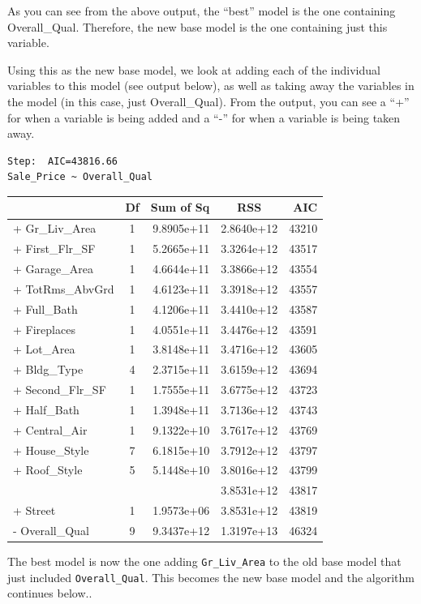 \documentclass[
  letterpaper,
  DIV=11,
  numbers=noendperiod]{scrreprt}
\begin{document}
As you can see from the above output, the ``best'' model is the one
containing Overall\_Qual. Therefore, the new base model is the one
containing just this variable. ~

Using this as the new base model, we look at adding each of the
individual variables to this model (see output below), as well as taking
away the variables in the model (in this case, just Overall\_Qual). From
the output, you can see a ``+'' for when a variable is being added and a
``-'' for when a variable is being taken away.

\begin{verbatim}
Step:  AIC=43816.66
Sale_Price ~ Overall_Qual
\end{verbatim}

\begin{longtable}[]{@{}lcrcr@{}}
\toprule()
& Df & Sum of Sq & RSS & AIC \\
\midrule()
\endhead
+ Gr\_Liv\_Area & 1 & 9.8905e+11 & 2.8640e+12 & 43210 \\
+ First\_Flr\_SF & 1 & 5.2665e+11 & 3.3264e+12 & 43517 \\
+ Garage\_Area & 1 & 4.6644e+11 & 3.3866e+12 & 43554 \\
+ TotRms\_AbvGrd & 1 & 4.6123e+11 & 3.3918e+12 & 43557 \\
+ Full\_Bath & 1 & 4.1206e+11 & 3.4410e+12 & 43587 \\
+ Fireplaces & 1 & 4.0551e+11 & 3.4476e+12 & 43591 \\
+ Lot\_Area & 1 & 3.8148e+11 & 3.4716e+12 & 43605 \\
+ Bldg\_Type & 4 & 2.3715e+11 & 3.6159e+12 & 43694 \\
+ Second\_Flr\_SF & 1 & 1.7555e+11 & 3.6775e+12 & 43723 \\
+ Half\_Bath & 1 & 1.3948e+11 & 3.7136e+12 & 43743 \\
+ Central\_Air & 1 & 9.1322e+10 & 3.7617e+12 & 43769 \\
+ House\_Style & 7 & 6.1815e+10 & 3.7912e+12 & 43797 \\
+ Roof\_Style & 5 & 5.1448e+10 & 3.8016e+12 & 43799 \\
& & & 3.8531e+12 & 43817 \\
+ Street & 1 & 1.9573e+06 & 3.8531e+12 & 43819 \\
- Overall\_Qual & 9 & 9.3437e+12 & 1.3197e+13 & 46324 \\
\bottomrule()
\end{longtable}

The best model is now the one adding \texttt{Gr\_Liv\_Area} to the old
base model that just included \texttt{Overall\_Qual}. This becomes the
new base model and the algorithm continues below..
\end{document}
